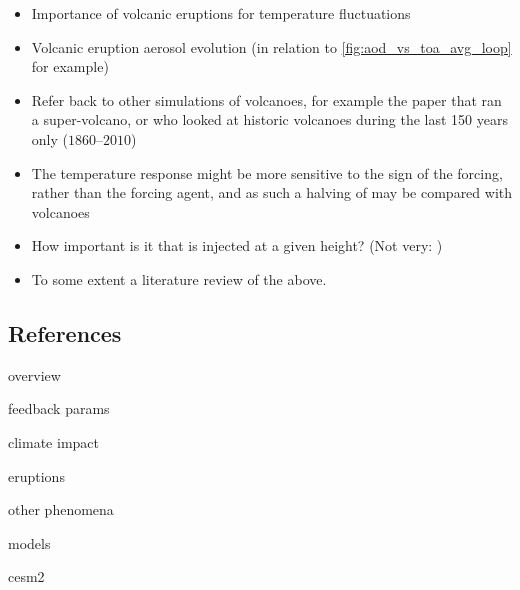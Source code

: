 \documentclass[twocol]{ametsocV5}
\begin{document}
\begin{itemize}
  \item Importance of volcanic eruptions for temperature fluctuations
  \item Volcanic eruption aerosol evolution (in relation to \cref{fig:aod_vs_toa_avg_loop} for
        example)
  \item Refer back to other simulations of volcanoes, for example the \citet{jones2005} paper
        that ran a super-volcano, or \citet{gregory2016} who looked at historic volcanoes during
        the last 150 years only (\(1860\)--\(2010\))
  \item The temperature response might be more sensitive to the sign of the forcing, rather than
        the forcing agent, and as such a halving of  may be compared with volcanoes
        \citep{gunther2022}
  \item How important is it that  is injected at a given height? (Not very:
        \citet{marshall2019})
  \item To some extent a literature review of the above.
\end{itemize}

\subsection*{References}

\begin{description}
  \item[overview] \citet{marshall2022}
  \item[feedback params] \citet{boer2007, gunther2022, gregory2020, hansen2005, knutti2017,
      marvel2016, merlis2014, ollila2016, pauling2021, richardson2019, salvi2022, wigley2005}
  \item[climate impact] \citet{gregory2016, jones2005, ottobliesner2016, santer2016,
      timmreck2009, timmreck2010, yang2019, yokohata2005, zanchettin2019}
  \item[eruptions] \citet{arfeuille2014, douglass2006, kleinschmitt2018, marshall2019,
      marshall2020, marshall2021, niemeier2015, niemeier2017, pitari2016b, soden2002,
      sukhodolov2018, tilmes2017}
  \item[other phenomena] \citet{chen2022, lehner2016, marshall2018}
  \item[models] \citet{rypdal2012}
  \item[cesm2] \citet{danabasoglu2020, gettleman2019, lawrence2019, li2013, liu2016, mills2016,
      smith2010}
\end{description}
\end{document}
